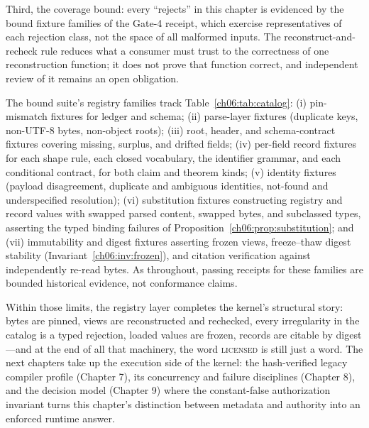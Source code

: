 Third, the coverage bound: every ``rejects'' in this chapter is
evidenced by the bound fixture families of the Gate-4 receipt, which
exercise representatives of each rejection class, not the space of all
malformed inputs. The reconstruct-and-recheck rule reduces what a
consumer must trust to the correctness of one reconstruction function;
it does not prove that function correct, and independent review of it
remains an open obligation.

\begin{checkclass}\label{ch06:check:fixtures}
The bound suite's registry families track
Table~\ref{ch06:tab:catalog}: (i) pin-mismatch fixtures for ledger and
schema; (ii) parse-layer fixtures (duplicate keys, non-UTF-8 bytes,
non-object roots); (iii) root, header, and schema-contract fixtures
covering missing, surplus, and drifted fields; (iv) per-field record
fixtures for each shape rule, each closed vocabulary, the identifier
grammar, and each conditional contract, for both claim and theorem
kinds; (v) identity fixtures (payload disagreement, duplicate and
ambiguous identities, not-found and underspecified resolution); (vi)
substitution fixtures constructing registry and record values with
swapped parsed content, swapped bytes, and subclassed types, asserting
the typed binding failures of
Proposition~\ref{ch06:prop:substitution}; and (vii) immutability and
digest fixtures asserting frozen views, freeze--thaw digest stability
(Invariant~\ref{ch06:inv:frozen}), and citation verification against
independently re-read bytes. As throughout, passing receipts for these
families are bounded historical evidence, not conformance claims.
\end{checkclass}

Within those limits, the registry layer completes the kernel's
structural story: bytes are pinned, views are reconstructed and
rechecked, every irregularity in the catalog is a typed rejection,
loaded values are frozen, records are citable by digest---and at the
end of all that machinery, the word \textsc{licensed} is still just a
word. The next chapters take up the execution side of the kernel: the
hash-verified legacy compiler profile (Chapter 7), its concurrency and
failure disciplines (Chapter 8), and the decision model (Chapter 9)
where the constant-false authorization invariant turns this chapter's
distinction between metadata and authority into an enforced runtime
answer.
